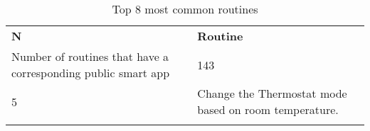 \begin{table}[t]
\centering
\scriptsize
\caption{{\small Top 8 most common routines}}
\label{tbl:top-10-routines}
\begin{tabular}{l|l}
\Xhline{2\arrayrulewidth}
{\bf N}& {\bf Routine}\\
\Xhline{2\arrayrulewidth}
Number of routines that have a corresponding public smart app & 143\\
5 & Change the Thermostat mode based on room temperature.\\
\Xhline{2\arrayrulewidth}
\Xhline{2\arrayrulewidth}
\end{tabular}
\end{table}
